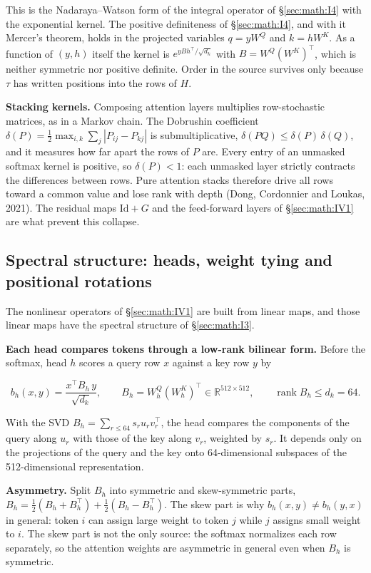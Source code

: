 This is the Nadaraya--Watson form of the integral operator of \S\ref{sec:math:I4} with
the exponential kernel. The positive definiteness of \S\ref{sec:math:I4}, and with it
Mercer's theorem, holds in the projected variables \(q = yW^Q\) and \(k = hW^K\).
As a function of \((y, h)\) itself the kernel is \(e^{yBh^{\top}/\sqrt{d_k}}\) with
\(B = W^Q (W^K)^\top\), which is neither symmetric nor positive definite. Order in the source survives only because \(\tau\) has
written positions into the rows of \(H\).

\textbf{Stacking kernels.} Composing attention layers multiplies
row-stochastic matrices, as in a Markov chain. The Dobrushin coefficient
\(\delta(P) = \tfrac12 \max_{i,k} \sum_j |P_{ij} - P_{kj}|\) is
submultiplicative, \(\delta(PQ) \le \delta(P)\, \delta(Q)\), and it measures how far apart the
rows of \(P\) are. Every entry of an unmasked softmax kernel is positive, so
\(\delta(P) < 1\): each unmasked layer strictly contracts the
differences between rows. Pure attention stacks therefore drive all rows
toward a common value and lose rank with depth (Dong, Cordonnier and
Loukas, 2021). The residual maps \(\mathrm{Id} + G\) and the feed-forward layers of
\S\ref{sec:math:IV1} are what prevent this collapse.

\subsection{Spectral structure: heads, weight tying and positional
rotations}\label{sec:math:IV4}

The nonlinear operators of \S\ref{sec:math:IV1} are built from linear maps, and those
linear maps have the spectral structure of \S\ref{sec:math:I3}.

\textbf{Each head compares tokens through a low-rank bilinear form.}
Before the softmax, head \(h\) scores a query row \(x\) against a key row \(y\) by

\[
b_h(x, y) = \frac{x^\top B_h\, y}{\sqrt{d_k}}, \qquad B_h = W_h^Q (W_h^K)^\top \in \mathbb R^{512\times 512}, \qquad \operatorname{rank} B_h \le d_k = 64 .
\]

With the SVD \(B_h = \sum_{r\le 64} s_r u_r v_r^{\top}\), the head
compares the components of the query along \(u_r\) with those of the key
along \(v_r\), weighted by \(s_r\). It depends only on the projections of the
query and the key onto 64-dimensional subspaces of the 512-dimensional
representation.

\textbf{Asymmetry.} Split \(B_h\) into symmetric and skew-symmetric parts,
\(B_h = \tfrac12(B_h + B_h^{\top}) + \tfrac12(B_h - B_h^{\top})\). The skew
part is why \(b_h(x, y) \neq b_h(y, x)\) in general: token \(i\) can assign large
weight to token \(j\) while \(j\) assigns small weight to \(i\). The skew part is not
the only source: the softmax normalizes each row separately, so the
attention weights are asymmetric in general even when \(B_h\) is symmetric.

